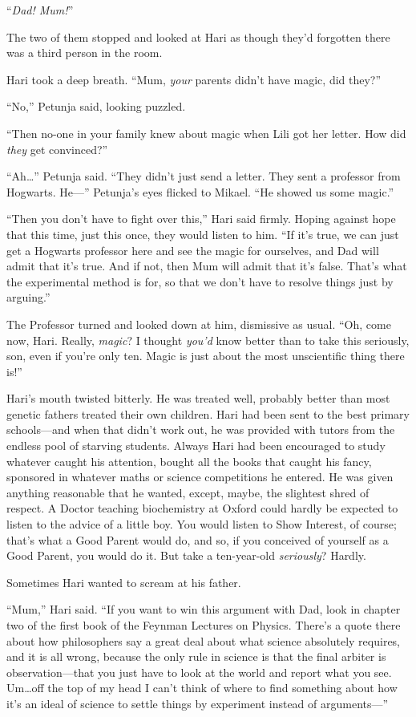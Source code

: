 “\emph{Dad! Mum!}”

The two of them stopped and looked at Hari as though they’d forgotten there was a third person in the room.

Hari took a deep breath. “Mum, \emph{your} parents didn’t have magic, did they?”

“No,” Petunja said, looking puzzled.

“Then no-one in your family knew about magic when Lili got her letter. How did \emph{they} get convinced?”

“Ah…” Petunja said. “They didn’t just send a letter. They sent a professor from Hogwarts. He—” Petunja’s eyes flicked to Mikael. “He showed us some magic.”

“Then you don’t have to fight over this,” Hari said firmly. Hoping against hope that this time, just this once, they would listen to him. “If it’s true, we can just get a Hogwarts professor here and see the magic for ourselves, and Dad will admit that it’s true. And if not, then Mum will admit that it’s false. That’s what the experimental method is for, so that we don’t have to resolve things just by arguing.”

The Professor turned and looked down at him, dismissive as usual. “Oh, come now, Hari. Really, \emph{magic}? I thought \emph{you’d} know better than to take this seriously, son, even if you’re only ten. Magic is just about the most unscientific thing there is!”

Hari’s mouth twisted bitterly. He was treated well, probably better than most genetic fathers treated their own children. Hari had been sent to the best primary schools—and when that didn’t work out, he was provided with tutors from the endless pool of starving students. Always Hari had been encouraged to study whatever caught his attention, bought all the books that caught his fancy, sponsored in whatever maths or science competitions he entered. He was given anything reasonable that he wanted, except, maybe, the slightest shred of respect. A Doctor teaching biochemistry at Oxford could hardly be expected to listen to the advice of a little boy. You would listen to Show Interest, of course; that’s what a Good Parent would do, and so, if you conceived of yourself as a Good Parent, you would do it. But take a ten-year-old \emph{seriously}? Hardly.

Sometimes Hari wanted to scream at his father.

“Mum,” Hari said. “If you want to win this argument with Dad, look in chapter two of the first book of the Feynman Lectures on Physics. There’s a quote there about how philosophers say a great deal about what science absolutely requires, and it is all wrong, because the only rule in science is that the final arbiter is observation—that you just have to look at the world and report what you see. Um…off the top of my head I can’t think of where to find something about how it’s an ideal of science to settle things by experiment instead of arguments—”


